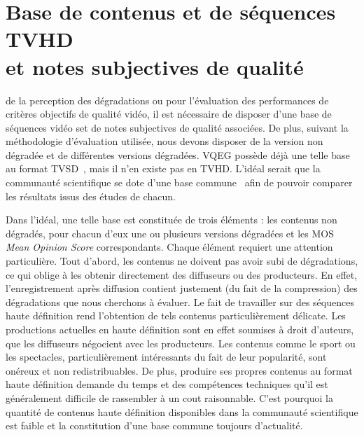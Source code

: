 
\chapter[Base de contenus et de séquences TVHD et notes subjectives de qualité]{Base de contenus et de séquences TVHD \\et notes subjectives de qualité} \label{annex:base}
 de la perception des dégradations ou pour l'évaluation des performances de critères objectifs de qualité vidéo, il est nécessaire de disposer d'une base de séquences vidéo set de notes subjectives de qualité associées. De plus, suivant la méthodologie d'évaluation utilisée, nous devons disposer de la version non dégradée et de différentes versions dégradées. VQEG possède déjà une telle base au format TVSD~\cite{vqeg-frtv1,vqeg-frtv2}, mais il n'en existe pas en TVHD. L'idéal serait que la communauté scientifique se dote d'une base commune~\cite{koh-vpqm2006} afin de pouvoir comparer les résultats issus des études de chacun.

Dans l'idéal, une telle base est constituée de trois éléments : les contenus non dégradés, pour chacun d'eux une ou plusieurs versions dégradées et les MOS \emph{Mean Opinion Score} correspondants. Chaque élément requiert une attention particulière. Tout d'abord, les contenus ne doivent pas avoir subi de dégradations, ce qui oblige à les obtenir directement des diffuseurs ou des producteurs. En effet, l'enregistrement après diffusion contient justement (du fait de la compression) des dégradations que nous cherchons à évaluer. Le fait de travailler sur des séquences haute définition rend l'obtention de tels contenus particulièrement délicate. Les productions actuelles en haute définition sont en effet soumises à droit d'auteurs, que les diffuseurs négocient avec les producteurs. Les contenus comme le sport ou les spectacles, particulièrement intéressants du fait de leur popularité, sont onéreux et non redistribuables. De plus, produire ses propres contenus au format haute définition demande du temps et des compétences techniques qu'il est généralement difficile de rassembler à un cout raisonnable. C'est pourquoi la quantité de contenus haute définition disponibles dans la communauté scientifique est faible et la constitution d'une base commune toujours d'actualité.

